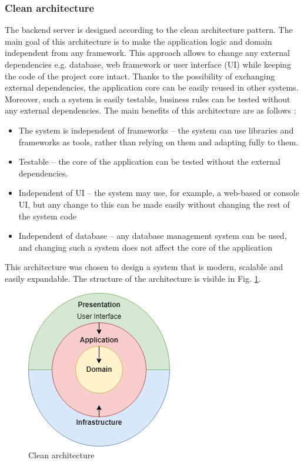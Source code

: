 \documentclass[a4paper,twoside,12pt]{book}
\begin{document}
\subsubsection{Clean architecture}
The backend server is designed according to the clean architecture pattern. The main goal of this architecture is to make the application logic and domain independent from any framework. This approach allows to change any external dependencies e.g. database, web framework or user interface (UI) while keeping the code of the project core intact. Thanks to the possibility of exchanging external dependencies, the application core can be easily reused in other systems. Moreover, such a system is easily testable, business rules can be tested without any external dependencies.  
The main benefits of this architecture are as follows \cite{bib:cleanArchitecture}:
\begin{itemize}
\item The system is independent of frameworks -- the system can use libraries and frameworks as tools, rather than relying on them and adapting fully to them.
\item Testable -- the core of the application can be tested without the external dependencies.
\item Independent of UI -- the system may use, for example, a web-based or console UI, but any change to this can be made easily without changing the rest of the system code
\item Independent of database -- any database management system can be used, and changing such a system does not affect the core of the application
\end{itemize}
This architecture was chosen to design a system that is modern, scalable and easily expandable.
The structure of the architecture is visible in Fig. \ref{fig:cleanArchitecture}.

\begin{figure}[htbp]
\centering
\includegraphics[scale=1]{images/cleanArchitecture.drawio.png}
\caption{Clean architecture}
\label{fig:cleanArchitecture}
\end{figure}
\end{document}
